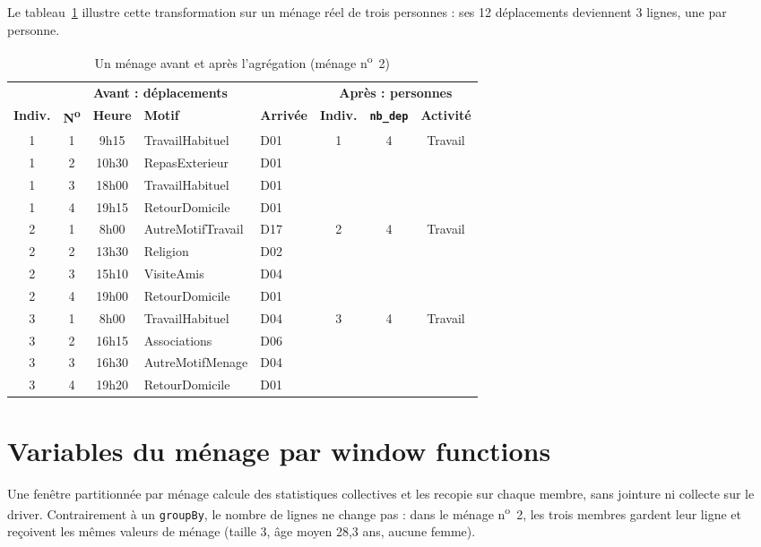 \documentclass[12pt,a4paper]{report}
\newcommand{\code}[1]{\texttt{\small #1}}
\newcommand{\1}{\mathbf{1}}
\begin{document}
Le tableau~\ref{tab:exemple_menage} illustre cette transformation sur un ménage réel de trois personnes : ses 12 déplacements deviennent 3 lignes, une par personne.

\begin{table}[H]
\centering
\caption{Un ménage avant et après l'agrégation (ménage n\textsuperscript{o}~2)}\label{tab:exemple_menage}
\small
\begin{tabular}{@{}cccll@{\hspace{1cm}}ccc@{}}
\toprule
\multicolumn{5}{c}{\textbf{Avant : déplacements}} & \multicolumn{3}{c}{\textbf{Après : personnes}} \\
\cmidrule(r){1-5}\cmidrule(l){6-8}
\textbf{Indiv.} & \textbf{N\textsuperscript{o}} & \textbf{Heure} & \textbf{Motif} & \textbf{Arrivée} & \textbf{Indiv.} & \textbf{\code{nb\_dep}} & \textbf{Activité} \\
\midrule
1 & 1 & 9h15 & TravailHabituel & D01 & \multirow{4}{*}{1} & \multirow{4}{*}{4} & \multirow{4}{*}{Travail} \\
1 & 2 & 10h30 & RepasExterieur & D01 & & & \\
1 & 3 & 18h00 & TravailHabituel & D01 & & & \\
1 & 4 & 19h15 & RetourDomicile & D01 & & & \\
\midrule
2 & 1 & 8h00 & AutreMotifTravail & D17 & \multirow{4}{*}{2} & \multirow{4}{*}{4} & \multirow{4}{*}{Travail} \\
2 & 2 & 13h30 & Religion & D02 & & & \\
2 & 3 & 15h10 & VisiteAmis & D04 & & & \\
2 & 4 & 19h00 & RetourDomicile & D01 & & & \\
\midrule
3 & 1 & 8h00 & TravailHabituel & D04 & \multirow{4}{*}{3} & \multirow{4}{*}{4} & \multirow{4}{*}{Travail} \\
3 & 2 & 16h15 & Associations & D06 & & & \\
3 & 3 & 16h30 & AutreMotifMenage & D04 & & & \\
3 & 4 & 19h20 & RetourDomicile & D01 & & & \\
\bottomrule
\end{tabular}
\end{table}

\section{Variables du ménage par window functions}
Une fenêtre partitionnée par ménage calcule des statistiques collectives et les recopie sur chaque membre, sans jointure ni collecte sur le driver. Contrairement à un \code{groupBy}, le nombre de lignes ne change pas : dans le ménage n\textsuperscript{o}~2, les trois membres gardent leur ligne et reçoivent les mêmes valeurs de ménage (taille 3, âge moyen 28,3 ans, aucune femme).
\end{document}
